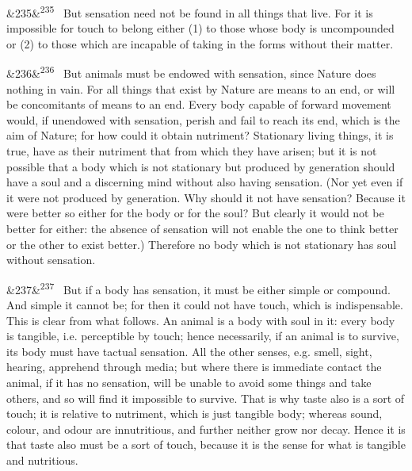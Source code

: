 \documentclass[12pt]{article}
\newcommand{\para}[1][]{\par\noindent\ifx&#1&\else\textsuperscript{\footnotesize #1}~\fi}
\begin{document}
\para[235] But sensation need not be found in all things that live. For it is impossible for touch to belong either (1) to those whose body is uncompounded or (2) to those which are incapable of taking in the forms without their matter.

\para[236] But animals must be endowed with sensation, since Nature does nothing in vain. For all things that exist by Nature are means to an end, or will be concomitants of means to an end. Every body capable of forward movement would, if unendowed with sensation, perish and fail to reach its end, which is the aim of Nature; for how could it obtain nutriment? Stationary living things, it is true, have as their nutriment that from which they have arisen; but it is not possible that a body which is not stationary but produced by generation should have a soul and a discerning mind without also having sensation. (Nor yet even if it were not produced by generation. Why should it not have sensation? Because it were better so either for the body or for the soul? But clearly it would not be better for either: the absence of sensation will not enable the one to think better or the other to exist better.) Therefore no body which is not stationary has soul without sensation.

\para[237] But if a body has sensation, it must be either simple or compound. And simple it cannot be; for then it could not have touch, which is indispensable. This is clear from what follows. An animal is a body with soul in it: every body is tangible, i.e. perceptible by touch; hence necessarily, if an animal is to survive, its body must have tactual sensation. All the other senses, e.g. smell, sight, hearing, apprehend through media; but where there is immediate contact the animal, if it has no sensation, will be unable to avoid some things and take others, and so will find it impossible to survive. That is why taste also is a sort of touch; it is relative to nutriment, which is just tangible body; whereas sound, colour, and odour are innutritious, and further neither grow nor decay. Hence it is that taste also must be a sort of touch, because it is the sense for what is tangible and nutritious.
\end{document}
